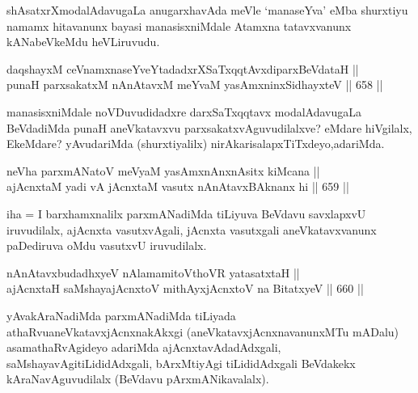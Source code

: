 \begin{artha}
shAsatxrXmodalAdavugaLa anugarxhavAda meVle `manaseYva' eMba shurxtiyu
namamx hitavanunx bayasi manasisxniMdale Atamxna tatavxvanunx
kANabeVkeMdu heVLiruvudu.
\end{artha}


\begin{shl}
daqshayxM ceVnamxnaseYveYtadadxrXSaTxqqtAvxdiparxBeVdataH || \\
punaH parxsakatxM nAnAtavxM meYvaM yasAmxninxSidhayxteV \hfill || 658 ||  
\end{shl}

\begin{artha}
manasisxniMdale noVDuvudidadxre darxSaTxqqtavx modalAdavugaLa
BeVdadiMda punaH aneVkatavxvu parxsakatxvAguvudilalxve? eMdare
hiVgilalx, EkeMdare? yAvudariMda (shurxtiyalilx)
nirAkarisalapxTiTxdeyo,\break adariMda.
\end{artha}


\begin{shl}
neVha parxmANatoV meVyaM yasAmxnAnxnA\s sitx kiMcana || \\
ajAcnxtaM yadi vA jAcnxtaM vasutx nAnAtavxBAknanx hi \hfill || 659 ||  
\end{shl}

\begin{artha}
iha = I barxhamxnalilx parxmANadiMda tiLiyuva BeVdavu savxlapxvU iruvudilalx, ajAcnxta vasutxvAgali, jAcnxta vasutxgali aneVkatavxvanunx paDediruva oMdu vasutxvU iruvudilalx.
\end{artha}


\begin{shl}
nAnAtavxbudadhxyeV nAlamamitoV\s thoVR yatasatxtaH || \\
ajAcnxtaH saMshayajAcnxtoV mithAyxjAcnxtoV na BitatxyeV \hfill || 660 ||  
\end{shl}

\begin{artha}
yAvakAraNadiMda parxmANadiMda tiLiyada athaRvu\break aneVkatavxjAcnxnakAkxgi
(aneVkatavxjAcnxnavanunxMTu mADalu) asamathaRvAgideyo adariMda
ajAcnxtavAdadAdxgali, saMshayavAgi\break tiLididAdxgali, bArxMtiyAgi
tiLididAdxgali BeVdakekx kAraNavAguvudilalx (BeVdavu pArxmANikavalalx).
\end{artha}

